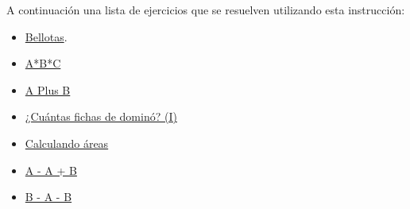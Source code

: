 A continuación una lista de ejercicios que se resuelven utilizando esta instrucción:

\begin{itemize}
	\item \href{https://dmoj.uclv.edu.cu/problem/bellotas} {Bellotas}.
	\item \href{https://dmoj.uclv.edu.cu/problem/abc} {A*B*C}
	\item \href{https://dmoj.uclv.edu.cu/problem/aplusb} {A Plus B}
	\item \href{https://dmoj.uclv.edu.cu/problem/dominoes1}{¿Cuántas fichas de dominó? (I)}
	\item \href{https://dmoj.uclv.edu.cu/problem/calculandoareas}{Calculando áreas}
	\item \href{https://matcomgrader.com/problem/9607/a-b/}{A - A + B}
	\item \href{https://matcomgrader.com/problem/9608/a-b/}{B - A - B}
\end{itemize}